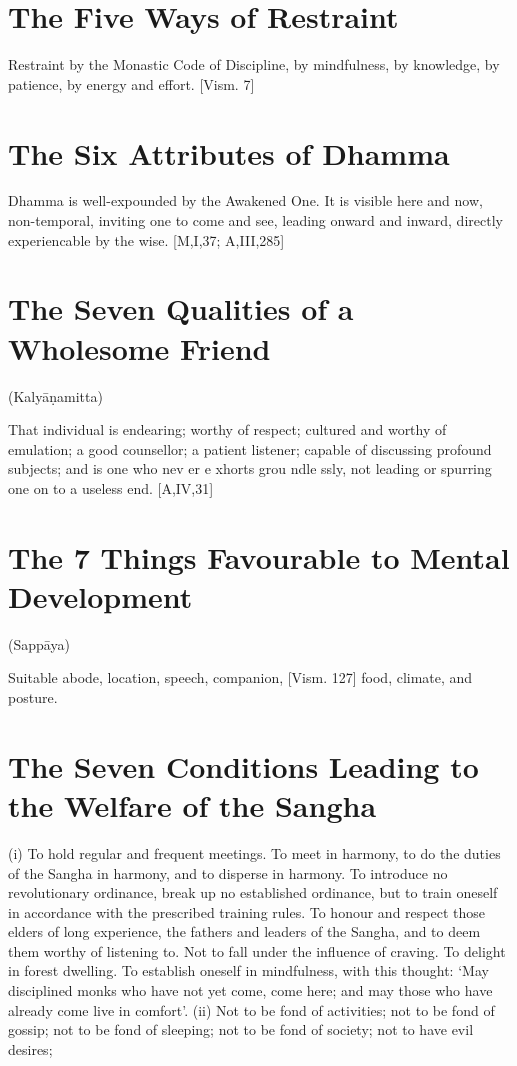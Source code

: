\section{The Five Ways of Restraint}

Restraint by the Monastic Code of Discipline,
by mindfulness, by knowledge, by patience, by
energy and effort.
[Vism. 7]

\section{The Six Attributes of Dhamma}

Dhamma is well-expounded by the Awakened
One. It is visible here and now, non-temporal,
inviting one to come and see, leading onward
and inward, directly experiencable by the wise.
[M,I,37; A,III,285]

\section{The Seven Qualities of a Wholesome Friend}

(Kalyāṇamitta)

That individual is endearing; worthy of
respect; cultured and worthy of emulation; a
good counsellor; a patient listener; capable of
discussing profound subjects; and is one who
nev er e xhorts grou ndle ssly, not leading or
spurring one on to a useless end.
[A,IV,31]

\section{The 7 Things Favourable to Mental Development}

(Sappāya)

Suitable abode, location, speech, companion,
[Vism. 127]
food, climate, and posture.

\section{The Seven Conditions Leading to the Welfare of the Sangha}

(i) To hold regular and frequent meetings.
To meet in harmony, to do the duties of the
Sangha in harmony, and to disperse in harmony. To introduce no revolutionary ordinance,
break up no established ordinance, but to train
oneself in accordance with the prescribed training rules. To honour and respect those elders of
long experience, the fathers and leaders of the
Sangha, and to deem them worthy of listening
to. Not to fall under the influence of craving. To
delight in forest dwelling. To establish oneself
in mindfulness, with this thought: ‘May disciplined monks who have not yet come, come
here; and may those who have already come
live in comfort’.
(ii) Not to be fond of activities; not to be
fond of gossip; not to be fond of sleeping; not
to be fond of society; not to have evil desires;


